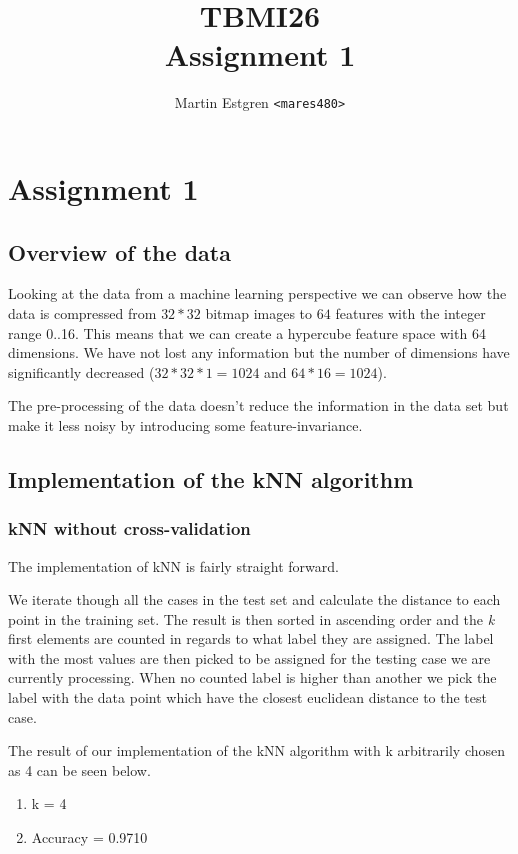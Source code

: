 \documentclass[a4paper,12pt]{article}
\title{TBMI26  \\
       Assignment 1}
\author{Martin Estgren \texttt{<mares480>}}
\begin{document}
    \maketitle %

\section{Assignment 1}

\subsection{Overview of the data}

  
Looking at the data from a machine learning perspective we can observe how the data is compressed from $32*32$ bitmap images to $64$ features with the integer range 0..16. This means that we can create a hypercube feature space with 64 dimensions. We have not lost any information but the number of dimensions have significantly decreased ($32*32 * 1 = 1024$ and $64*16 = 1024$).

The pre-processing of the data doesn't reduce the information in the data set but make it less noisy by introducing some feature-invariance.

\subsection{Implementation of the kNN algorithm}

\subsubsection{kNN without cross-validation}
The implementation of kNN is fairly straight forward. 

We iterate though all the cases in the test set and calculate the distance to each point in the training set. The result is then sorted in ascending order and the \textit{k} first elements are counted in regards to what label they are assigned. The label with the most values are then picked to be assigned for the testing case we are currently processing. When no counted label is higher than another we pick the label with the data point which have the closest euclidean distance to the test case.

The result of our implementation of the kNN algorithm with k arbitrarily chosen as 4 can be seen below.

\begin{enumerate}
\item k = 4
\item Accuracy = 0.9710
\end{enumerate}
\end{document}
